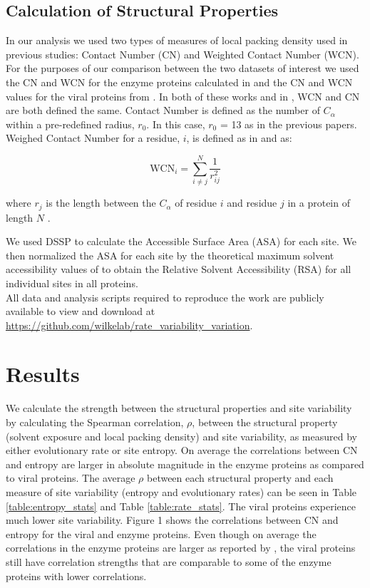 \documentclass[12pt]{article}
\begin{document}
    \subsection*{Calculation of Structural Properties}
In our analysis we used two types of measures of local packing density used in previous studies: Contact Number (CN) and Weighted Contact Number (WCN). For the purposes of our comparison between the two datasets of interest we used the CN and WCN for the enzyme proteins calculated in \cite{Huangetal2014} and the CN and WCN values for the viral proteins from \cite{Shahmoradietal2014}. In both of these works and in \cite{Yehetal2014}, WCN and CN are both defined the same.  Contact Number is defined as the number of $C_{\alpha}$ within a pre-redefined radius, $r_0$. In this case, $r_0$ = 13 as in the previous papers. Weighed Contact Number for a residue, $i$, is defined as in \cite{Liaoetal2005} and \cite{Huangetal2014} as:
	
	\begin{equation} \label{wcn_eqn}
		\text{WCN}_i = \sum_{i \neq j}^{N} \frac{1}{r_{ij}^2 } 
	\end{equation}
	
	where $r_j$ is the length between the $C_{\alpha}$ of residue $i$ and residue $j$ in a protein of length $N$ \citep{Yehetal2014}. 

\indent We used DSSP \citep{Kabschetal2005} to calculate the Accessible Surface Area (ASA) for each site. We then normalized the ASA for each site by the theoretical maximum solvent accessibility values of \cite{Tienetal2013} to obtain the Relative Solvent Accessibility (RSA) for all individual sites in all proteins. \\

All data and analysis scripts required to reproduce the work are publicly available to view and download at \url{https://github.com/wilkelab/rate_variability_variation}.

\section{Results}
\label{sec:results}

We calculate the strength between the structural properties and site variability by calculating the Spearman correlation, $\rho$,  between the structural property (solvent exposure and local packing density) and site variability, as measured by either evolutionary rate or site entropy. On average the correlations between CN and entropy are larger in absolute magnitude in the enzyme proteins as compared to viral proteins. The average $\rho$ between each structural property and each measure of site variability (entropy and evolutionary rates) can be seen in Table \ref{table:entropy_stats}  and Table \ref{table:rate_stats}. The viral proteins experience much lower site variability. Figure 1 shows the correlations between CN and entropy for the viral and enzyme proteins. Even though on average the correlations in the enzyme proteins are larger as reported by \cite{Yehetal2014}, the viral proteins still have correlation strengths that are comparable to some of the enzyme proteins with lower correlations. 
\end{document}

